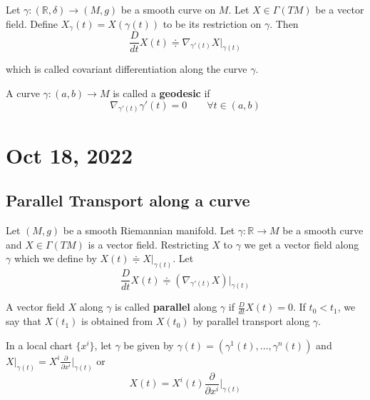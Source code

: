 \documentclass[12pt,a4paper]{article}
\theoremstyle{definition}
\theoremstyle{greenbox}
\newcommand{\R}{\mathbb{R}}
\newcommand{\define}{\doteqdot}
\begin{document}
    Let $ \gamma : (\R, \delta) \to (M,g) $ be a smooth curve on $ M $. Let $ X \in \Gamma(TM) $ be a vector field. Define $ X_{\gamma}(t) = X(\gamma(t))$ to be its restriction on $ \gamma $. Then 
    \[ \frac{D}{dt} X(t) \define \nabla_{\gamma'(t)}X|_{\gamma(t)}  \]
    
    which is called covariant differentiation along the curve $ \gamma $. 
    \begin{defn}
        A curve $ \gamma :(a,b) \to M$ is called a \textbf{geodesic}  if 
        \[ \nabla_{\gamma'(t)}\gamma'(t) = 0 \qquad \forall t \in (a,b) \]
    \end{defn}

    \section{Oct 18, 2022}

    \subsection*{Parallel Transport along a curve}  

    Let $ (M,g) $ be a smooth Riemannian manifold. Let $ \gamma : \R \to M $ be a smooth curve and $ X \in \Gamma(TM) $ is a vector field. Restricting $ X $ to $ \gamma $ we get a vector field along $ \gamma $ which we define by $ X(t) \define X|_{\gamma(t)} $. Let 
    \[ \frac{D}{dt} X(t) \define (\nabla_{\gamma'(t)}X)|_{\gamma(t)} \]
    \begin{defn}
        A vector field $ X $ along $ \gamma $ is called \textbf{parallel}  along $ \gamma  $ if $ \frac{D}{dt} X(t)  =0$. If $ t_{0}< t_{1} $, we say that $ X(t_{1}) $ is obtained from $ X(t_{0}) $ by parallel transport along $ \gamma $. 
    \end{defn}
    In a local chart $ \{x^{i}\} $, let $ \gamma  $ be given by $ \gamma(t) = (\gamma^{1}(t), \dots, \gamma^{n}(t)) $ and $ X|_{\gamma(t)} = X^{i} \frac{ \partial}{ \partial x^{i}}\big|_{\gamma(t)} $ or 
    \[ X(t) = X^{i}(t) \frac{ \partial}{ \partial x^{i}}\bigg|_{\gamma(t)}\]
\end{document}
